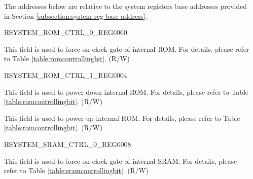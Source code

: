 The addresses below are relative to the system registers base addresses provided in Section \ref{subsection:system-reg-base-address}.

\begin{register}{H}{SYSTEM\_ROM\_CTRL\_0\_REG}{\hexprefix{}0000}\label{regdesc:SYSTEMROMCTRL0REG}
%
%
\regnewline%
\begin{regdesc}\begin{reglist}
\label{fielddesc:SYSTEMROMFO}\item [SYSTEM\_ROM\_FO] This field is used to force on clock gate of internal ROM. For details, please refer to Table \ref{table:romcontrollingbit}. (R/W)

\end{reglist}\end{regdesc}
\end{register}

\begin{register}{H}{SYSTEM\_ROM\_CTRL\_1\_REG}{\hexprefix{}0004}\label{regdesc:SYSTEMROMCTRL1REG}
%
%
%
\regnewline%
\begin{regdesc}\begin{reglist}
\label{fielddesc:SYSTEMROMFORCEPD}\item [SYSTEM\_ROM\_FORCE\_PD] This field is used to power down internal ROM. For details, please refer to Table \ref{table:romcontrollingbit}. (R/W)
\label{fielddesc:SYSTEMROMFORCEPU}\item [SYSTEM\_ROM\_FORCE\_PU] This field is used to power up internal ROM. For details, please refer to Table \ref{table:romcontrollingbit}. (R/W)

\end{reglist}\end{regdesc}
\end{register}


\begin{register}{H}{SYSTEM\_SRAM\_CTRL\_0\_REG}{\hexprefix{}0008}\label{regdesc:SYSTEMSRAMCTRL0REG}
%
%
\regnewline%
\begin{regdesc}\begin{reglist}
\label{fielddesc:SYSTEMSRAMFO}\item [SYSTEM\_SRAM\_FO] This field is used to force on clock gate of internal SRAM. For details, please refer to Table \ref{table:sramcontrollingbit}. (R/W)

\end{reglist}\end{regdesc}
\end{register}


